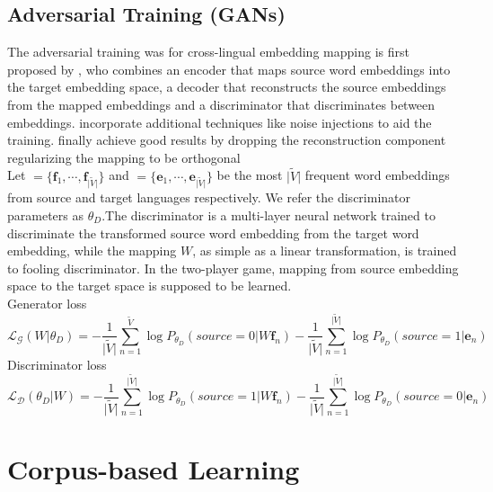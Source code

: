 \subsection{Adversarial Training (GANs)}
The adversarial training was for cross-lingual embedding mapping is first proposed by \cite{barone2016towards}, who combines an encoder that maps source word embeddings into the target embedding space, a decoder that reconstructs the source embeddings from the mapped embeddings and a discriminator that discriminates between embeddings. \cite{zhang2017adversarial} incorporate additional techniques like noise injections to aid the training. \cite{conneau2017word} finally achieve good results by dropping the reconstruction component regularizing the mapping to be orthogonal\\
Let ${=\{ \bm{f}_1, \cdots, \bm{f}_{{\lvert \tilde{V} \rvert}}\}}$ and ${ = \{ \bm{e}_1, \cdots , \bm{e}_{{\lvert \tilde{V} \rvert}}\}}$ be the most ${\lvert \tilde{V} \rvert}$ frequent word embeddings from source and target languages respectively. We refer the discriminator parameters as ${\theta_D}$.The discriminator is a multi-layer neural network trained to discriminate the transformed source word embedding from the target word embedding, while the mapping $W$, as simple as a linear transformation, is trained to fooling discriminator. In the two-player game, mapping from source embedding space to the target space is supposed to be learned.\\

Generator loss 
\[ \mathcal{L_G}(W|\theta_D) =  -\frac{1}{{\lvert \tilde{V} \rvert}} \sum_{n=1}^{\tilde{V}}\log P_{\theta_D}(source=0|W \bm{f}_n) - \frac{1}{{\lvert \tilde{V} \rvert}} \sum_{n=1}^{{\lvert \tilde{V} \rvert}} \log P_{\theta_D}(source = 1 | \bm{e}_n) \]
Discriminator loss
\[ \mathcal{L_D}(\theta_D | W) =  -\frac{1}{{\lvert \tilde{V} \rvert}} \sum_{n=1}^{{\lvert \tilde{V} \rvert}} \log P_{\theta_D}(source = 1| W\bm{f}_n) - \frac{1}{{\lvert \tilde{V} \rvert}} \sum_{n=1}^{{\lvert \tilde{V} \rvert}} \log P_{\theta_D}(source=0| \bm{e}_n) \]	 
\section{Corpus-based Learning}
